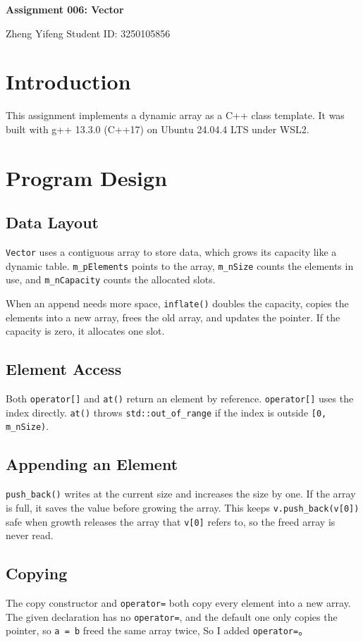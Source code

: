 \documentclass[10pt,a4paper]{article}
\begin{document}
\begin{center}
{\LARGE\bfseries Assignment 006: Vector\par}
\medskip
Zheng Yifeng \textbar{} Student ID: 3250105856
\end{center}

\section{Introduction}
This assignment implements a dynamic array as a C++ class template.
It was built with g++ 13.3.0 (C++17) on Ubuntu 24.04.4 LTS under WSL2.

\section{Program Design}

\subsection{Data Layout}
\texttt{Vector} uses a contiguous array to store data, which grows its capacity like a dynamic table.
\texttt{m\_pElements} points to the array, \texttt{m\_nSize} counts the elements in use, and \texttt{m\_nCapacity} counts the allocated slots.

When an append needs more space, \texttt{inflate()} doubles the capacity, copies the elements into a new array, frees the old array, and updates the pointer.
If the capacity is zero, it allocates one slot.

\subsection{Element Access}
Both \texttt{operator[]} and \texttt{at()} return an element by reference.
\texttt{operator[]} uses the index directly.
\texttt{at()} throws \texttt{std::out\_of\_range} if the index is outside \texttt{[0, m\_nSize)}.

\subsection{Appending an Element}
\texttt{push\_back()} writes at the current size and increases the size by one.
If the array is full, it saves the value before growing the array.
This keeps \texttt{v.push\_back(v[0])} safe when growth releases the array that \texttt{v[0]} refers to, so the freed array is never read.

\subsection{Copying}
The copy constructor and \texttt{operator=} both copy every element into a new array.
The given declaration has no \texttt{operator=}, and the default one only copies the pointer, so \texttt{a = b} freed the same array twice, So I added \texttt{operator=}{\punctfont 。}
\end{document}
